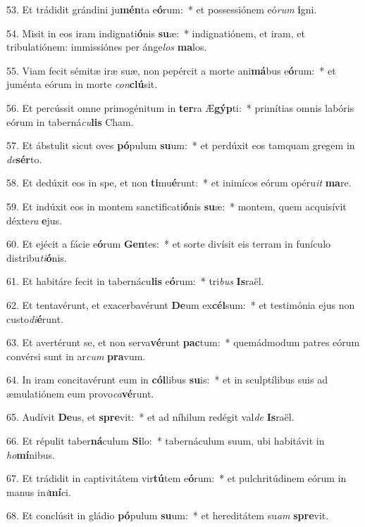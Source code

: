 53. Et trádidit grándini ju\textbf{mén}ta e\textbf{ó}rum:~*  et possessiónem eó\textit{rum} \textbf{i}gni.\

54. Misit in eos iram indignati\textbf{ó}nis \textbf{su}æ:~*  indignatiónem, et iram, et tribulatiónem: immissiónes per ánge\textit{los} \textbf{ma}los.\

55. Viam fecit sémitæ iræ suæ, non pepércit a morte ani\textbf{má}bus e\textbf{ó}rum:~*  et juménta eórum in morte \textit{con}\textbf{clú}sit.\

56. Et percússit omne primogénitum in \textbf{ter}ra Æ\textbf{gýp}ti:~*  primítias omnis labóris eórum in taberná\textit{cu}\textbf{lis} Cham.\

57. Et ábstulit sicut oves \textbf{pó}pulum \textbf{su}um:~*  et perdúxit eos tamquam gregem in \textit{de}\textbf{sér}to.\

58. Et dedúxit eos in spe, et non \textbf{ti}mu\textbf{é}runt:~*  et inimícos eórum opéru\textit{it} \textbf{ma}re.\

59. Et indúxit eos in montem sanctificati\textbf{ó}nis \textbf{su}æ:~*  montem, quem acquisívit déxte\textit{ra} \textbf{e}jus.\

60. Et ejécit a fácie e\textbf{ó}rum \textbf{Gen}tes:~*  et sorte divísit eis terram in funículo distribu\textit{ti}\textbf{ó}nis.\

61. Et habitáre fecit in tabernácu\textbf{lis} e\textbf{ó}rum:~*  tri\textit{bus} \textbf{Is}raël.\

62. Et tentavérunt, et exacerbavérunt \textbf{De}um ex\textbf{cél}sum:~*  et testimónia ejus non custo\textit{di}\textbf{é}runt.\

63. Et avertérunt se, et non serva\textbf{vé}runt \textbf{pac}tum:~*  quemádmodum patres eórum convérsi sunt in ar\textit{cum} \textbf{pra}vum.\

64. In iram concitavérunt eum in \textbf{cól}libus \textbf{su}is:~*  et in sculptílibus suis ad æmulatiónem eum provo\textit{ca}\textbf{vé}runt.\

65. Audívit \textbf{De}us, et \textbf{spre}vit:~*  et ad níhilum redégit val\textit{de} \textbf{Is}raël.\

66. Et répulit taber\textbf{ná}culum \textbf{Si}lo:~*  tabernáculum suum, ubi habitávit in \textit{ho}\textbf{mí}nibus.\

67. Et trádidit in captivitátem vir\textbf{tú}tem e\textbf{ó}rum:~*  et pulchritúdinem eórum in manus in\textit{i}\textbf{mí}ci.\

68. Et conclúsit in gládio \textbf{pó}pulum \textbf{su}um:~*  et hereditátem su\textit{am} \textbf{spre}vit.\


